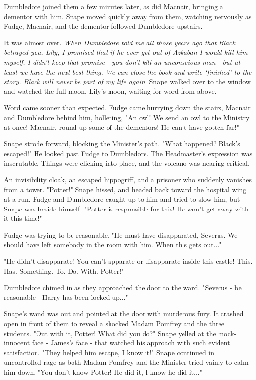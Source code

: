 \documentclass[a4paper,11pt]{article}
\begin{document}
Dumbledore joined them a few minutes later, as did Macnair, bringing a dementor with him. Snape moved quickly away from them, watching nervously as Fudge, Macnair, and the dementor followed Dumbledore upstairs.

It was almost over. \emph{When Dumbledore told me all those years ago that Black betrayed you, Lily, I promised that if he ever got out of Azkaban I would kill him myself. I didn't keep that promise - you don't kill an unconscious man - but at least we have the next best thing. We can close the book and write `finished' to the story. Black will never be part of my life again.} Snape walked over to the window and watched the full moon, Lily's moon, waiting for word from above.

Word came sooner than expected. Fudge came hurrying down the stairs, Macnair and Dumbledore behind him, hollering, "An owl! We send an owl to the Ministry at once! Macnair, round up some of the dementors! He can't have gotten far!"

Snape strode forward, blocking the Minister's path. "What happened? Black's escaped!" He looked past Fudge to Dumbledore. The Headmaster's expression was inscrutable. Things were clicking into place, and the volcano was nearing critical.

An invisibility cloak, an escaped hippogriff, and a prisoner who suddenly vanishes from a tower. "Potter!" Snape hissed, and headed back toward the hospital wing at a run. Fudge and Dumbledore caught up to him and tried to slow him, but Snape was beside himself. "Potter is responsible for this! He won't get away with it this time!"

Fudge was trying to be reasonable. "He must have disapparated, Severus. We should have left somebody in the room with him. When this gets out..."

"He didn't disapparate! You can't apparate or disapparate inside this castle! This. Has. Something. To. Do. With. Potter!"

Dumbledore chimed in as they approached the door to the ward. "Severus - be reasonable - Harry has been locked up..."

Snape's wand was out and pointed at the door with murderous fury. It crashed open in front of them to reveal a shocked Madam Pomfrey and the three students. "Out with it, Potter! What did you do?" Snape yelled at the mock-innocent face - James's face - that watched his approach with such evident satisfaction. "They helped him escape, I know it!" Snape continued in uncontrolled rage as both Madam Pomfrey and the Minister tried vainly to calm him down. "You don't know Potter! He did it, I know he did it..."
\end{document}
